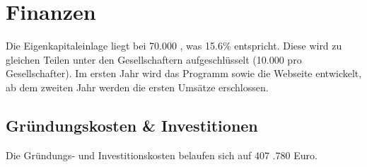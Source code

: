 \chapter{Finanzen}
  Die Eigenkapitaleinlage liegt bei 70.000 \EURcr, was 15.6\% entspricht. Diese wird zu gleichen Teilen unter den Gesellschaftern aufgeschlüsselt (10.000 \EURcr pro Gesellschafter). Im ersten Jahr wird das Programm sowie die Webseite entwickelt, ab dem zweiten Jahr werden die ersten Umsätze erschlossen.
    
    \section{Gr\"undungskosten \& Investitionen}
        Die Gründungs- und Investitionskosten belaufen sich auf 407 .780 Euro. 
        

